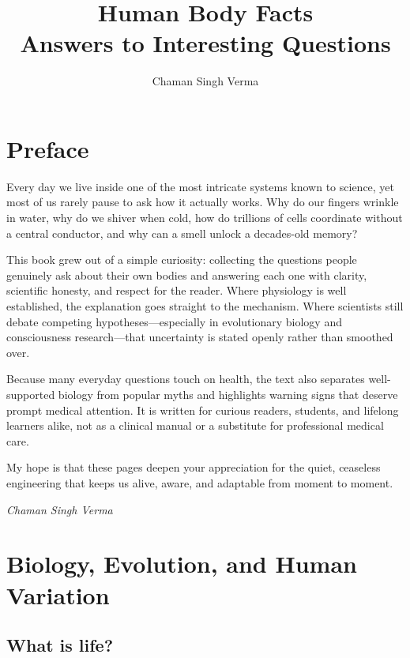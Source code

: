 \documentclass[11pt,oneside]{report}
\title{\Huge Human Body Facts\\[0.5em]
       \large Answers to Interesting Questions}
\author{Chaman Singh Verma}
\date{}
\begin{document}

\maketitle
\tableofcontents

\chapter*{Preface}
{}

Every day we live inside one of the most intricate systems known to science,
yet most of us rarely pause to ask how it actually works. Why do our fingers
wrinkle in water, why do we shiver when cold, how do trillions of cells
coordinate without a central conductor, and why can a smell unlock a decades-old
memory?

This book grew out of a simple curiosity: collecting the questions people
genuinely ask about their own bodies and answering each one with clarity,
scientific honesty, and respect for the reader. Where physiology is well
established, the explanation goes straight to the mechanism. Where scientists
still debate competing hypotheses---especially in evolutionary biology and
consciousness research---that uncertainty is stated openly rather than smoothed
over.

Because many everyday questions touch on health, the text also separates
well-supported biology from popular myths and highlights warning signs that
deserve prompt medical attention. It is written for curious readers, students,
and lifelong learners alike, not as a clinical manual or a substitute for
professional medical care.

My hope is that these pages deepen your appreciation for the quiet, ceaseless
engineering that keeps us alive, aware, and adaptable from moment to moment.

\medskip
\noindent\textit{Chaman Singh Verma}

\clearpage
{}
\chapter{Biology, Evolution, and Human Variation}

\section{What is life?}
\end{document}
